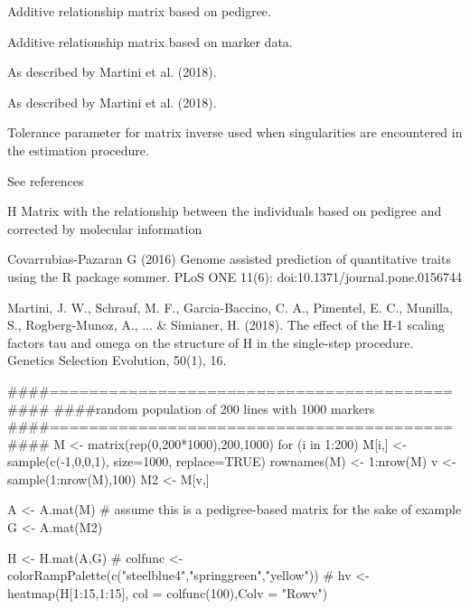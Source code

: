 \documentclass[a4paper]{book}
\begin{document}
\begin{Arguments}
\begin{ldescription}
\item[\code{A}] 
Additive relationship matrix based on pedigree.

\item[\code{G}] 
Additive relationship matrix based on marker data.  

\item[\code{tau}] 
As described by Martini et al. (2018).

\item[\code{omega}] 
As described by Martini et al. (2018). 

\item[\code{tolparinv}] 
Tolerance parameter for matrix inverse used when singularities are encountered in the estimation procedure.

\end{ldescription}
\end{Arguments}
%
\begin{Details}\relax
See references 
\end{Details}
%
\begin{Value}

H Matrix with the relationship between the individuals based on pedigree and corrected by molecular information

\end{Value}
%
\begin{References}\relax

Covarrubias-Pazaran G (2016) Genome assisted prediction of quantitative traits using the R package sommer. PLoS ONE 11(6): doi:10.1371/journal.pone.0156744 

Martini, J. W., Schrauf, M. F., Garcia-Baccino, C. A., Pimentel, E. C., Munilla, S., Rogberg-Munoz, A., ... \& Simianer, H. (2018). The effect of the H-1 scaling factors tau and omega on the structure of H in the single-step procedure. Genetics Selection Evolution, 50(1), 16.

\end{References}
%
\begin{Examples}
\begin{ExampleCode}
####=========================================####
####random population of 200 lines with 1000 markers
####=========================================####
M <- matrix(rep(0,200*1000),200,1000)
for (i in 1:200) {
  M[i,] <- sample(c(-1,0,0,1), size=1000, replace=TRUE)
}
rownames(M) <- 1:nrow(M)
v <- sample(1:nrow(M),100)
M2 <- M[v,]

A <- A.mat(M) # assume this is a pedigree-based matrix for the sake of example
G <- A.mat(M2)

H <- H.mat(A,G)
# colfunc <- colorRampPalette(c("steelblue4","springgreen","yellow"))
# hv <- heatmap(H[1:15,1:15], col = colfunc(100),Colv = "Rowv")
\end{ExampleCode}
\end{Examples}
\end{document}
